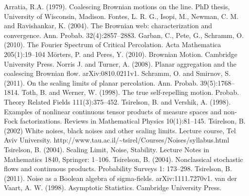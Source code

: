 \begin{thebibliography}{99}
 Arratia, R.A. (1979). Coalescing Brownian motions on
  the line. PhD thesis, University of Wisconsin, Madison.
 Fontes, L. R. G., Isopi, M., Newman, C. M. and
  Ravishankar, K. (2004). The Brownian web: characterization and
  convergence. Ann. Probab. 32(4):2857--2883.
 Garban, C., Pete, G., Schramm,
  O. (2010). The Fourier Spectrum of Critical Percolation.  Acta Mathematica 205(1):19--104
 M\"orters, P. and Peres, Y. (2010). Brownian
  Motion.  Cambridge University Press.
 Norris J. and Turner, A. (2008). Planar
  aggregation and the coalescing Brownian
  flow. arXiv:0810.0211v1.
  Schramm, O. and Smirnov, S. (2011).
  On the scaling limits of planar percolation.
  Ann. Probab. 39(5):1768--1814.
 Toth, B. and Werner, W. (1998). The true
  self-repelling motion. Probab. Theory Related Fields
  111(3):375--452.
  Tsirelson, B. and Vershik, A. (1998). Examples of nonlinear continuous
  tensor products of measure spaces and non-Fock factorizations. Reviews
  in Mathematical Physics 10(1):81--145.
  Tsirelson, B. (2002)
  White noises, black noises and other scaling limits.
  Lecture course, Tel Aviv University.
  http://www.tau.ac.il/\textasciitilde{}tsirel/Courses/Noises/syllabus.html
  Tsirelson, B. (2004).
  Scaling Limit, Noise, Stability.
  Lecture Notes in Mathematics 1840, Springer: 1--106.
 Tsirelson, B. (2004).
  Nonclassical stochastic flows and continuous products.
  Probability Surveys 1: 173--298.
  Tsirelson, B. (2011).
  Noise as a Boolean algebra of sigma-fields.
  arXiv:1111.7270v1.
 van der Vaart, A. W. (1998). Asymptotic Statistics.
  Cambridge University Press.
\end{thebibliography}

